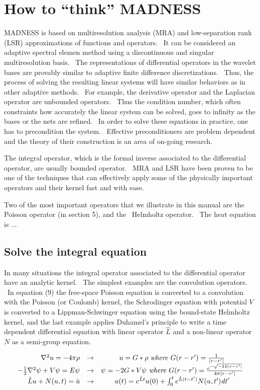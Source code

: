 \documentclass[letterpaper]{article}
\begin{document}
\section{How to ``think'' MADNESS}
MADNESS is based on multiresolution analysis (MRA) and low-separation rank (LSR) approximations of functions and
operators. \ It can be considered an adaptive spectral elemen method using a discontinuous and singular multiresolution
basis. \ The representations of differential operators in the wavelet bases are provably similar to adaptive finite
difference discretizations. \ Thus, the process of solving the resulting linear systems will have similar behaviors as
in other adaptive methods. \ For example, the derivative operator and the Laplacian operator are unbounded operators.
\ Thus the condition number, which often constraints how accurately the linear system can be solved, goes to infinity
as the bases or the nets are refined. \ In order to solve these equations in practice, one has to precondition the
system. \ Effective preconditioners are problem dependent and the theory of their construction is an area of on-going
research.

The integral operator, which is the formal inverse associated to the differential operator, are usually bounded
operator. \ MRA and LSR have been proven to be one of the techniques that can effectively apply some of the physically
important operators and their kernel fast and with ease.

Two of the most important operators that we illustrate in this manual are the Poisson operator (in section 5), and the
\ Helmholtz operator. \ The heat equation is ...

\subsection{Solve the integral equation}
In many situations the integral operator associated to the differential operator have an analytic kernel. \ The simplest
examples are the convolution operators. \ In equation (9) the free-space Poisson equation is converted to a convolution
with the Poisson (or Coulomb) kernel, the Schrodinger equation with potential  $V$ is converted to a Lippman-Schwinger
equation using the bound-state Helmholtz kernel, and the last example applies Duhamel's principle to write a time
dependent differential equation with linear operator  $\hat{L}$ and a non-linear operator  $N$ as a semi-group
equation.

\begin{equation}\label{seq:refText8}
\begin{matrix}\hfill \nabla ^{2}u=-4\pi \rho &\to &u=G\ast \rho
\ \mathrm{\mathit{where}}\ G(r-r')=\frac{1}{|r-r'|}\\-{\frac{1}{2}}\nabla ^{2}\psi +V\psi =E\psi &\to &\psi =-2G\ast
V\psi \ \mathrm{\mathit{where}}\ G(r-r')=\frac{e^{-\sqrt{-2E|r-r'|}}}{4\pi |r-r'|}\\\hfill \hat{L}u+N(u,t)=\dot{u}&\to
&u(t)=e^{\hat{L}t}u(0)+\int _{0}^{t}e^{\hat{L}(t-t')}N(u,t')\mathit{dt}'\end{matrix}
\end{equation}
\end{document}
